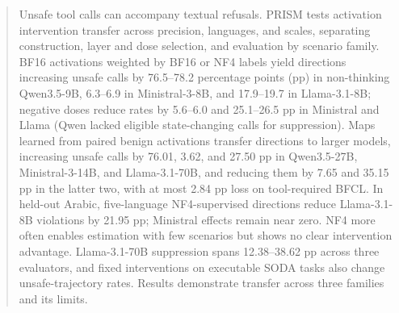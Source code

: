 \begin{abstract}
Unsafe tool calls can accompany textual refusals. PRISM tests activation intervention transfer across precision, languages, and scales, separating construction, layer and dose selection, and evaluation by scenario family. BF16 activations weighted by BF16 or NF4 labels yield directions increasing unsafe calls by 76.5–78.2 percentage points (pp) in non-thinking Qwen3.5-9B, 6.3–6.9 in Ministral-3-8B, and 17.9–19.7 in Llama-3.1-8B; negative doses reduce rates by 5.6–6.0 and 25.1–26.5 pp in Ministral and Llama (Qwen lacked eligible state-changing calls for suppression). Maps learned from paired benign activations transfer directions to larger models, increasing unsafe calls by 76.01, 3.62, and 27.50 pp in Qwen3.5-27B, Ministral-3-14B, and Llama-3.1-70B, and reducing them by 7.65 and 35.15 pp in the latter two, with at most 2.84 pp loss on tool-required BFCL. In held-out Arabic, five-language NF4-supervised directions reduce Llama-3.1-8B violations by 21.95 pp; Ministral effects remain near zero. NF4 more often enables estimation with few scenarios but shows no clear intervention advantage. Llama-3.1-70B suppression spans 12.38–38.62 pp across three evaluators, and fixed interventions on executable SODA tasks also change unsafe-trajectory rates. Results demonstrate transfer across three families and its limits.
\end{abstract}

